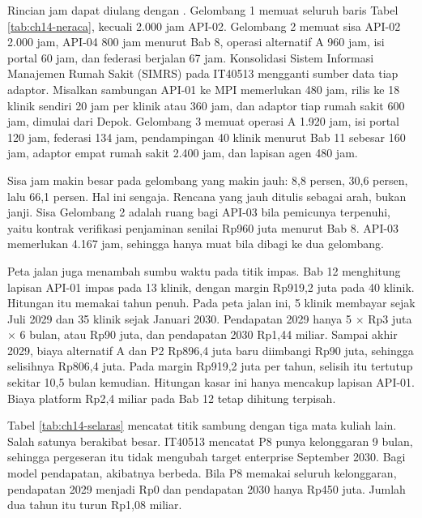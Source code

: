 Rincian jam dapat diulang dengan . Gelombang 1 memuat seluruh baris Tabel \ref{tab:ch14-neraca}, kecuali 2.000 jam API-02. Gelombang 2 memuat sisa API-02 2.000 jam, API-04 800 jam menurut Bab 8, operasi alternatif A 960 jam, isi portal 60 jam, dan federasi berjalan 67 jam. Konsolidasi Sistem Informasi Manajemen Rumah Sakit (SIMRS) pada IT40513 mengganti
sumber data tiap adaptor. Misalkan sambungan API-01 ke MPI memerlukan 480 jam, rilis ke 18 klinik sendiri 20 jam per klinik atau 360 jam, dan adaptor tiap rumah sakit 600 jam, dimulai dari Depok. Gelombang 3 memuat operasi A 1.920 jam, isi portal 120 jam, federasi 134 jam, pendampingan 40 klinik menurut Bab 11 sebesar 160 jam, adaptor empat rumah sakit 2.400 jam, dan lapisan agen 480 jam.

Sisa jam makin besar pada gelombang yang makin jauh: 8,8 persen, 30,6 persen, lalu 66,1 persen. Hal ini sengaja. Rencana yang jauh ditulis sebagai arah, bukan janji. Sisa Gelombang 2 adalah ruang bagi API-03 bila pemicunya terpenuhi, yaitu kontrak verifikasi penjaminan senilai Rp960 juta menurut Bab 8. API-03 memerlukan 4.167 jam, sehingga hanya muat bila dibagi ke dua gelombang.

Peta jalan juga menambah sumbu waktu pada titik impas. Bab 12 menghitung lapisan API-01 impas pada 13 klinik, dengan margin Rp919,2 juta pada 40 klinik. Hitungan itu memakai tahun penuh. Pada peta jalan ini, 5 klinik membayar sejak Juli 2029 dan 35 klinik sejak Januari 2030. Pendapatan 2029 hanya 5 $\times$ Rp3 juta $\times$ 6 bulan, atau Rp90 juta, dan pendapatan 2030 Rp1,44 miliar.
Sampai akhir 2029, biaya alternatif A dan P2 Rp896,4 juta baru diimbangi Rp90 juta, sehingga selisihnya Rp806,4 juta. Pada margin Rp919,2 juta per tahun, selisih itu tertutup sekitar 10,5 bulan kemudian. Hitungan kasar ini hanya mencakup lapisan API-01. Biaya platform Rp2,4 miliar pada Bab 12 tetap dihitung terpisah.

Tabel \ref{tab:ch14-selaras} mencatat titik sambung dengan tiga mata kuliah lain. Salah satunya berakibat besar. IT40513 mencatat P8 punya kelonggaran 9 bulan, sehingga pergeseran itu tidak mengubah target enterprise September 2030. Bagi model pendapatan, akibatnya berbeda. Bila P8 memakai seluruh kelonggaran, pendapatan 2029 menjadi Rp0 dan pendapatan 2030 hanya Rp450 juta. Jumlah dua tahun itu turun Rp1,08 miliar.

